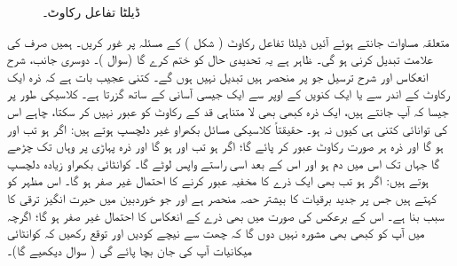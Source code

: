  \begin{figure}
\centering
{}
\caption{ڈیلٹا تفاعل رکاوٹ۔}
\label{شکل_غیر_تابع_ڈیلٹا_تفاعل_رکاوٹ}
\end{figure}
متعلقہ مساوات جانتے ہوئے آئیں ڈیلٹا تفاعل رکاوٹ ( شکل ) کے مسئلہ پر غور کریں۔ ہمیں صرف  کی علامت تبدیل کرنی ہو گی۔ ظاہر ہے یہ تحدیدی حال کو ختم کرے گا (سوال )۔ دوسری جانب، شرح انعکاس اور شرح ترسیل جو  پر منحصر ہیں تبدیل نہیں ہوں گے۔ کتنی عجیب بات ہے کہ ذرہ ایک رکاوٹ کے اندر سے یا ایک کنویں کے اوپر سے ایک جیسی آسانی کے ساتھ گزرتا ہے۔ کلاسیکی طور پر جیسا کہ آپ جانتے ہیں، ایک ذرہ کبھی بھی لا متناہی قد کے رکاوٹ کو عبور نہیں کر سکتا، چاہے اس کی توانائی کتنی ہی کیوں نہ ہو۔ حقیقتاً کلاسیکی مسائل بکھراو غیر دلچسپ ہوتے ہیں: اگر  ہو تب  اور  ہو گا اور ذرہ ہر صورت رکاوٹ عبور کر پائے گا؛ اگر  ہو تب  اور  ہو گا اور ذرہ پہاڑی پر وہاں تک چڑھے گا جہاں تک اس میں دم ہو اور اس کے بعد اسی راستے واپس لوٹے گا۔ کوانٹائی بکھراو زیادہ دلچسپ ہوتے ہیں: اگر  ہو تب بھی ایک ذرے کا مخفیہ عبور کرنے کا احتمال غیر صفر ہو گا۔ اس مظہر کو  کہتے ہیں جس پر جدید برقیات کا بیشتر حصہ منحصر ہے اور جو خوردبین میں حیرت انگیز ترقی کا سبب بنا ہے۔ اس کے برعکس  کی صورت میں بھی ذرے کے انعکاس کا احتمال غیر صفر ہو گا؛ اگرچہ میں آپ کو کبھی بھی مشورہ نہیں دوں گا کہ چھت سے نیچے کودیں اور توقع رکھیں کہ کوانٹائی میکانیات آپ کی جان بچا پائے گی ( سوال  دیکھیے گا)۔
 
